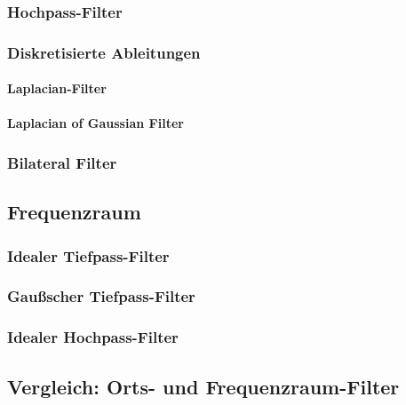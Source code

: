 \documentclass[a4paper, 11pt, accentcolor = tud3b]{tudreport}
\begin{document}
				\subsubsection{Hochpass-Filter} %

				\subsubsection{Diskretisierte Ableitungen} %

					\paragraph{Laplacian-Filter} %

					\paragraph{Laplacian of Gaussian Filter} %

				\subsubsection{Bilateral Filter} %

			\subsection{Frequenzraum} %

				\subsubsection{Idealer Tiefpass-Filter} %

				\subsubsection{Gaußscher Tiefpass-Filter} %

				\subsubsection{Idealer Hochpass-Filter} %

			\subsection{Vergleich: Orts- und Frequenzraum-Filter} %
\end{document}
